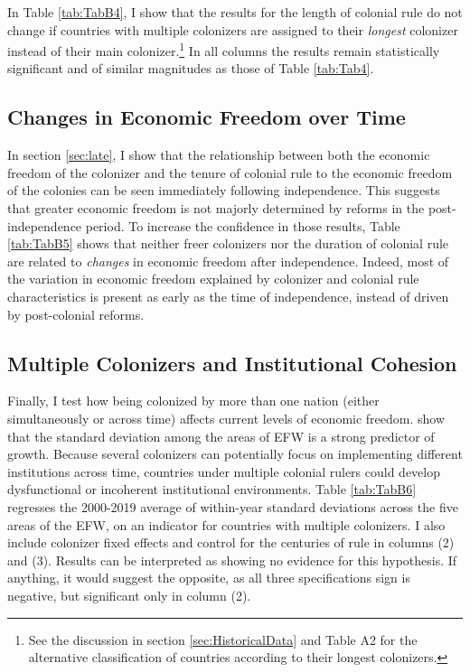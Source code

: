 \documentclass[a4paper,12pt]{article}
\begin{document}
In Table \ref{tab:TabB4}, I show that the results for the length of colonial rule do not change if countries with multiple colonizers are assigned to their \textit{longest} colonizer instead of their main colonizer.\footnote{See the discussion in section \ref{sec:HistoricalData} and Table A2 for the alternative classification of countries according to their longest colonizers.} In all columns the results remain statistically significant and of similar magnitudes as those of Table \ref{tab:Tab4}.

\subsection{Changes in Economic Freedom over Time}\label{delta}

In section \ref{sec:late}, I show that the relationship between both the economic freedom of the colonizer and the tenure of colonial rule to the economic freedom of the colonies can be seen immediately following independence. This suggests that greater economic freedom is not majorly determined by reforms in the post-independence period. To increase the confidence in those results, Table \ref{tab:TabB5} shows that neither freer colonizers nor the duration of colonial rule are related to \textit{changes} in economic freedom after independence. Indeed, most of the variation in economic freedom explained by colonizer and colonial rule characteristics is present as early as the time of independence, instead of driven by post-colonial reforms.

\subsection{Multiple Colonizers and Institutional Cohesion}

Finally, I test how being colonized by more than one nation (either simultaneously or across time) affects current levels of economic freedom. \cite{bolen2020does} show that the standard deviation among the areas of EFW is a strong predictor of growth. Because several colonizers can potentially focus on implementing different institutions across time, countries under multiple colonial rulers could develop dysfunctional or incoherent institutional environments. Table \ref{tab:TabB6} regresses the 2000-2019 average of within-year standard deviations across the five areas of the EFW, on an indicator for countries with multiple colonizers. I also include colonizer fixed effects and control for the centuries of rule in columns (2) and (3). Results can be interpreted as showing no evidence for this hypothesis. If anything, it would suggest the opposite, as all three specifications sign is negative, but significant only in column (2).
\end{document}
